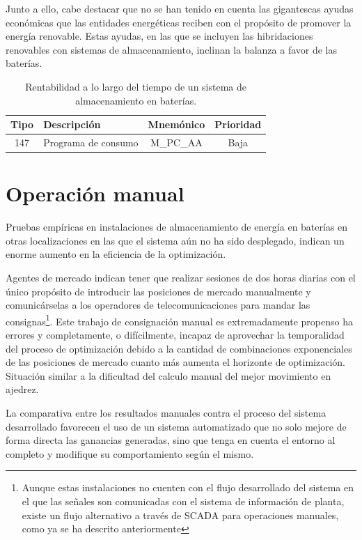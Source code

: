 Junto a ello, cabe destacar que no se han tenido en cuenta las gigantescas ayudas económicas que las entidades energéticas reciben con el propósito de promover la energía renovable. Estas ayudas, en las que se incluyen las hibridaciones renovables con sistemas de almacenamiento, inclinan la balanza a favor de las baterías.

\begin{table}[ht]
  \centering
  \begin{tabular}{|c|p{7.5cm}|c|c|}
    \hline
    Tipo & Descripción         & Mnemónico & Prioridad\\
    \hline
    147  & Programa de consumo & M\_PC\_AA & Baja     \\
    \hline
  \end{tabular}
  \caption{Rentabilidad a lo largo del tiempo de un sistema de almacenamiento en baterías.}
  \label{tab:rentabilidad-bess}
\end{table}

\section{Operación manual}
\label{makereference7.2}

Pruebas empíricas en instalaciones de almacenamiento de energía en baterías en otras localizaciones en las que el sistema aún no ha sido desplegado, indican un enorme aumento en la eficiencia de la optimización.

Agentes de mercado indican tener que realizar sesiones de dos horas diarias con el único propósito de introducir las posiciones de mercado manualmente y comunicárselas a los operadores de telecomunicaciones para mandar las consignas\footnote{Aunque estas instalaciones no cuenten con el flujo desarrollado del sistema en el que las señales son comunicadas con el sistema de información de planta, existe un flujo alternativo a través de SCADA para operaciones manuales, como ya se ha descrito anteriormente}. Este trabajo de consignación manual es extremadamente propenso ha errores y completamente, o difícilmente, incapaz de aprovechar la temporalidad del proceso de optimización debido a la cantidad de combinaciones exponenciales de las posiciones de mercado cuanto más aumenta el horizonte de optimización. Situación similar a la dificultad del calculo manual del mejor movimiento en ajedrez.

La comparativa entre los resultados manuales contra el proceso del sistema desarrollado favorecen el uso de un sistema automatizado que no solo mejore de forma directa las ganancias generadas, sino que tenga en cuenta el entorno al completo y modifique su comportamiento según el mismo.


